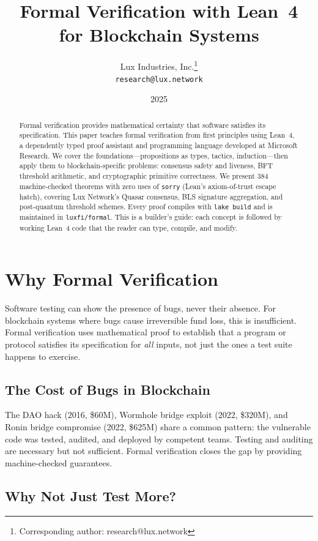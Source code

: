 \documentclass[11pt,a4paper]{article}
\title{Formal Verification with Lean~4 for Blockchain Systems}
\author{
Lux Industries, Inc.\thanks{Corresponding author: research@lux.network}\\
\texttt{research@lux.network}
}
\date{2025}
\begin{document}
\luxcoverpage

\begin{abstract}
Formal verification provides mathematical certainty that software satisfies its specification.
This paper teaches formal verification from first principles using Lean~4, a dependently typed
proof assistant and programming language developed at Microsoft Research. We cover the
foundations---propositions as types, tactics, induction---then apply them to blockchain-specific
problems: consensus safety and liveness, BFT threshold arithmetic, and cryptographic
primitive correctness. We present 384 machine-checked theorems with zero uses of
\texttt{sorry} (Lean's axiom-of-trust escape hatch), covering Lux Network's Quasar
consensus, BLS signature aggregation, and post-quantum threshold schemes. Every proof
compiles with \texttt{lake build} and is maintained in \texttt{luxfi/formal}. This is a
builder's guide: each concept is followed by working Lean~4 code that the reader can type,
compile, and modify.
\end{abstract}

\tableofcontents
\newpage

\section{Why Formal Verification}

Software testing can show the presence of bugs, never their absence. For blockchain systems
where bugs cause irreversible fund loss, this is insufficient. Formal verification uses
mathematical proof to establish that a program or protocol satisfies its specification for
\emph{all} inputs, not just the ones a test suite happens to exercise.

\subsection{The Cost of Bugs in Blockchain}

The DAO hack (2016, \$60M), Wormhole bridge exploit (2022, \$320M), and Ronin bridge
compromise (2022, \$625M) share a common pattern: the vulnerable code was tested, audited,
and deployed by competent teams. Testing and auditing are necessary but not sufficient.
Formal verification closes the gap by providing machine-checked guarantees.

\subsection{Why Not Just Test More?}
\end{document}
